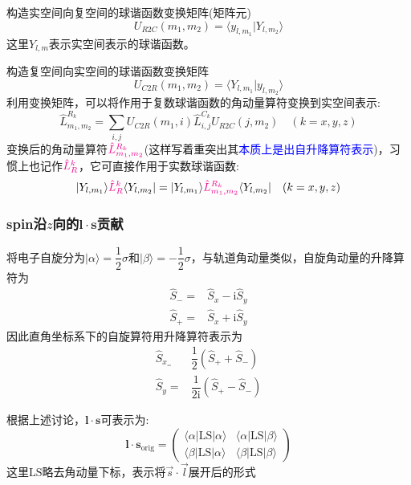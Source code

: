 \documentclass[10pt, oneside, a4paper]{article}      %
\begin{document}
构造实空间向复空间的球谐函数变换矩阵(矩阵元)
\begin{displaymath}
	U_{R2C}(m_1,m_2)=\langle y_{l,m_1}|Y_{l,m_2}\rangle
\end{displaymath}
这里$Y_{l,m}$表示实空间表示的球谐函数。

构造复空间向实空间的球谐函数变换矩阵
\begin{displaymath}
	U_{C2R}(m_1,m_2)=\langle Y_{l,m_1}|y_{l,m_2}\rangle
\end{displaymath}
利用变换矩阵，可以将作用于复数球谐函数的角动量算符变换到实空间表示:~
\begin{displaymath}
	\hat{L}_{m_1,m_2}^{R_k}=\sum_{i,j}U_{C2R}(m_1,i)\hat{L}_{i,j}^{C_k}U_{R2C}(j,m_2) \quad(k=x,y,z)
\end{displaymath}
变换后的角动量算符$\textcolor{magenta}{\hat{L}_{m_1,m_2}^{R_k}}$(这样写着重突出其\textcolor{blue}{本质上是出自升降算符表示})，习惯上也记作$\textcolor{magenta}{\hat{L}_R^{k}}$，它可直接作用于实数球谐函数:
\begin{displaymath}
	|Y_{l,m_1}\rangle\textcolor{magenta}{\hat{L}_R^{k}}\langle Y_{l,m_2}|=|Y_{l,m_1}\rangle\textcolor{magenta}{\hat{L}_{m_1,m_2}^{R_k}}\langle Y_{l,m_2}| \quad (k=x,y,z)
\end{displaymath}

\subsubsection{\rm{spin}沿$z$向的$\mathbf{l}\cdot\mathbf{s}$贡献}
将电子自旋分为$|\alpha\rangle=\dfrac12\sigma$和$|\beta\rangle=-\dfrac12\sigma$，与轨道角动量类似，自旋角动量的升降算符为
\begin{displaymath}
	\begin{aligned}
		\hat S_-=&\hat S_x-\mathrm{i}\hat S_y\\
		\hat S_+=&\hat S_x+\mathrm{i}\hat S_y
	\end{aligned}
\end{displaymath}
因此直角坐标系下的自旋算符用升降算符表示为
\begin{displaymath}
	\begin{aligned}
		\hat S_x_=&\dfrac12(\hat S_++\hat S_-)\\
		\hat S_y=&\dfrac1{2\mathrm{i}}(\hat S_+-\hat S_-)
	\end{aligned}
\end{displaymath}

根据上述讨论，$\mathbf{l}\cdot\mathbf{s}$可表示为:
\begin{displaymath}
	\mathbf{l}\cdot\mathbf{s}_{\mathrm{orig}}=
	\begin{pmatrix}
		\langle\alpha|\mathrm{LS}|\alpha\rangle &\langle\alpha|\mathrm{LS}|\beta\rangle \\
		\langle\beta|\mathrm{LS}|\alpha\rangle &\langle\beta|\mathrm{LS}|\beta\rangle
	\end{pmatrix}
\end{displaymath}
这里$\mathrm{LS}$略去角动量下标，表示将$\vec s\cdot\vec l$展开后的形式
\end{document}

